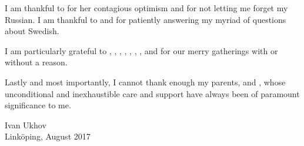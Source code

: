 I am thankful to  for her contagious optimism and
for not letting me forget my Russian. I am thankful to 
and  for patiently answering my myriad of questions about
Swedish.

I am particularly grateful to , ,
, , ,
, , and
 for our merry gatherings with or without a reason.

Lastly and most importantly, I cannot thank enough my parents,
 and , whose unconditional and
inexhaustible care and support have always been of paramount significance to me.

\vspace{4em}
\hfill
\begin{minipage}{0.35\textwidth}
Ivan Ukhov\\
Linköping, August 2017
\end{minipage}

